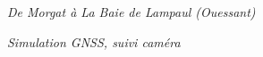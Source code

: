\begin{center}
\begin{figure}[ht]
\caption{\label{equiProj}\textit{De Morgat à La Baie de Lampaul (Ouessant)}}
\end{figure}
\end{center}
\begin{center}
\begin{figure}[ht]
\caption{\label{equiProj}\textit{Simulation GNSS, suivi caméra}}
\end{figure}
\end{center}
\newpage
